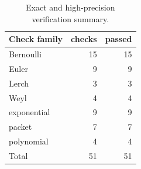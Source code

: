 \begin{table}[htbp]
\centering
\small
\caption{Exact and high-precision verification summary.}
\label{tab:checks}
\begin{tabular}{lrr}
\toprule
Check family & checks & passed\\
\midrule
Bernoulli & 15 & 15\\
Euler & 9 & 9\\
Lerch & 3 & 3\\
Weyl & 4 & 4\\
exponential & 9 & 9\\
packet & 7 & 7\\
polynomial & 4 & 4\\
\midrule
Total & 51 & 51\\
\bottomrule
\end{tabular}
\end{table}
